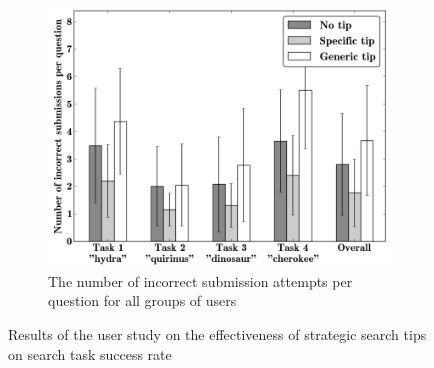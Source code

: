 \begin{figure}[h]
\begin{subfigure}{0.32\textwidth}
  \centering
  \includegraphics[width=\textwidth]{img/hints_incorrect}
  \caption{The number of incorrect submission attempts per question for all groups of users}
  \label{figure:users:hints:incorrect}
  \end{subfigure}
\caption{Results of the user study on the effectiveness of strategic search tips on search task success rate}
\label{fig:users:hints:results}
\end{figure}

